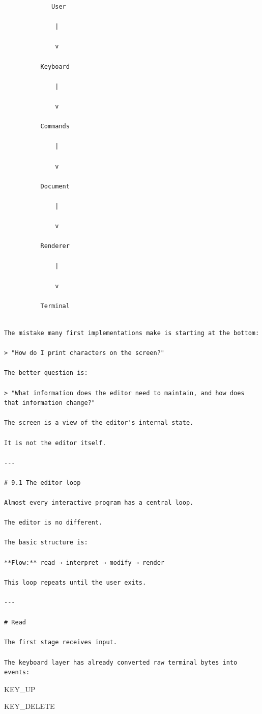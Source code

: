 \documentclass[
  oneside,
  openany]{book}
\begin{document}
\begin{verbatim}
             User

              |

              v

          Keyboard

              |

              v

          Commands

              |

              v

          Document

              |

              v

          Renderer

              |

              v

          Terminal
\end{verbatim}

\begin{verbatim}

The mistake many first implementations make is starting at the bottom:

> "How do I print characters on the screen?"

The better question is:

> "What information does the editor need to maintain, and how does that information change?"

The screen is a view of the editor's internal state.

It is not the editor itself.

---

# 9.1 The editor loop

Almost every interactive program has a central loop.

The editor is no different.

The basic structure is:

**Flow:** read → interpret → modify → render

This loop repeats until the user exits.

---

# Read

The first stage receives input.

The keyboard layer has already converted raw terminal bytes into events:
\end{verbatim}

KEY\_UP

KEY\_DELETE
\end{document}
